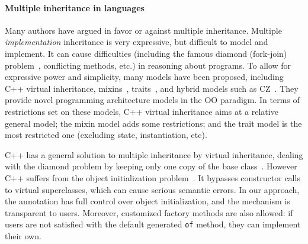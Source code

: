 \paragraph{Multiple inheritance in \objectoriented languages}
Many authors have argued in favor or against multiple inheritance.
Multiple \emph{implementation}
inheritance is very expressive, but difficult to model and implement. It can
cause difficulties (including the famous diamond (fork-join)
problem~\cite{bracha90mixin,Sak89dis}, conflicting methods, etc.) in reasoning about
programs. To allow for expressive power and simplicity, many
models have been proposed, including C++ virtual inheritance,
mixins~\cite{bracha90mixin}, traits~\cite{scharli03traits}, and hybrid models
such as CZ~\cite{malayeri2009cz}.  They provide novel programming architecture
models in the OO paradigm. In terms of restrictions set on these models, C++
virtual inheritance aims at a relative general model; the mixin model adds some
restrictions; and the trait model is the most restricted one (excluding
state, instantiation, etc).

C++ has a general solution to multiple inheritance by
virtual inheritance, dealing with the diamond problem by keeping only
one copy of the base class~\cite{ellis1990annotated}. However C++
suffers from the object initialization problem~\cite{malayeri2009cz}.
It bypasses constructor calls to virtual superclasses, which can
cause serious semantic errors. In our approach, the \mixin
annotation has full control over object initialization,
and the mechanism is transparent to users. Moreover, customized factory
methods are also allowed: if users are not satisfied with the default
generated \texttt{of} method, they can implement their own.

